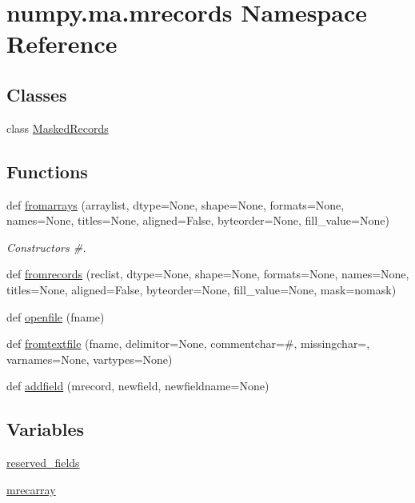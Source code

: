 \hypertarget{namespacenumpy_1_1ma_1_1mrecords}{}\section{numpy.\+ma.\+mrecords Namespace Reference}
\label{namespacenumpy_1_1ma_1_1mrecords}
\subsection*{Classes}
\begin{DoxyCompactItemize}
\item 
class \hyperlink{classnumpy_1_1ma_1_1mrecords_1_1MaskedRecords}{Masked\+Records}
\end{DoxyCompactItemize}
\subsection*{Functions}
\begin{DoxyCompactItemize}
\item 
def \hyperlink{namespacenumpy_1_1ma_1_1mrecords_a7a6d16a1971e40fd2fd2a6c6cfe4b457}{fromarrays} (arraylist, dtype=None, shape=None, formats=None, names=None, titles=None, aligned=False, byteorder=None, fill\+\_\+value=None)
\begin{DoxyCompactList}\small\item\em Constructors \#. \end{DoxyCompactList}\item 
def \hyperlink{namespacenumpy_1_1ma_1_1mrecords_a359f017d2aa568063b7f9c6adf5f4d68}{fromrecords} (reclist, dtype=None, shape=None, formats=None, names=None, titles=None, aligned=False, byteorder=None, fill\+\_\+value=None, mask=nomask)
\item 
def \hyperlink{namespacenumpy_1_1ma_1_1mrecords_a6aafb839783f26cf38717f5100938e44}{openfile} (fname)
\item 
def \hyperlink{namespacenumpy_1_1ma_1_1mrecords_a839888b6e8c0caf880133c2b18f257ca}{fromtextfile} (fname, delimitor=None, commentchar=\textquotesingle{}\#\textquotesingle{}, missingchar=\textquotesingle{}\textquotesingle{}, varnames=None, vartypes=None)
\item 
def \hyperlink{namespacenumpy_1_1ma_1_1mrecords_aab8c28cddff89a1854da159f62102747}{addfield} (mrecord, newfield, newfieldname=None)
\end{DoxyCompactItemize}
\subsection*{Variables}
\begin{DoxyCompactItemize}
\item 
\hyperlink{namespacenumpy_1_1ma_1_1mrecords_ad8d0e24a00d2315215ca374495ac7346}{reserved\+\_\+fields}
\item 
\hyperlink{namespacenumpy_1_1ma_1_1mrecords_a208e716532e0db541eb2398f5ab12135}{mrecarray}
\end{DoxyCompactItemize}


